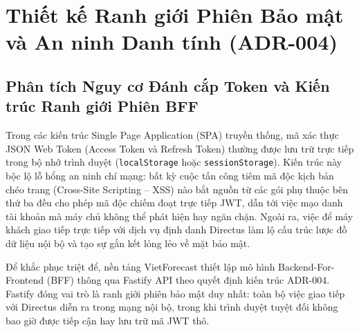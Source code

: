 \section{Thiết kế Ranh giới Phiên Bảo mật và An ninh Danh tính (ADR-004)}
\label{sec:auth_session_boundary}

\subsection{Phân tích Nguy cơ Đánh cắp Token và Kiến trúc Ranh giới Phiên BFF}
\label{subsec:token_threat_analysis_vi}
Trong các kiến trúc Single Page Application (SPA) truyền thống, mã xác thực JSON Web Token (Access Token và Refresh Token) \cite{rfc7519} thường được lưu trữ trực tiếp trong bộ nhớ trình duyệt (\texttt{localStorage} hoặc \texttt{sessionStorage}). Kiến trúc này bộc lộ lỗ hổng an ninh chí mạng: bất kỳ cuộc tấn công tiêm mã độc kịch bản chéo trang (Cross-Site Scripting -- XSS) nào bắt nguồn từ các gói phụ thuộc bên thứ ba đều cho phép mã độc chiếm đoạt trực tiếp JWT, dẫn tới việc mạo danh tài khoản mà máy chủ không thể phát hiện hay ngăn chặn. Ngoài ra, việc để máy khách giao tiếp trực tiếp với dịch vụ định danh Directus làm lộ cấu trúc lược đồ dữ liệu nội bộ và tạo sự gắn kết lỏng lẻo về mặt bảo mật.

Để khắc phục triệt để, nền tảng VietForecast thiết lập mô hình Backend-For-Frontend (BFF) thông qua Fastify API theo quyết định kiến trúc ADR-004. Fastify đóng vai trò là ranh giới phiên bảo mật duy nhất: toàn bộ việc giao tiếp với Directus diễn ra trong mạng nội bộ, trong khi trình duyệt tuyệt đối không bao giờ được tiếp cận hay lưu trữ mã JWT thô.

